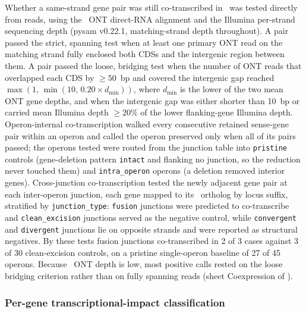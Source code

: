 Whether a same-strand gene pair was still co-transcribed in \syna~was tested directly from reads, using the \syna~ONT direct-RNA alignment and the Illumina per-strand sequencing depth (pysam v0.22.1, matching-strand depth throughout).
A pair passed the strict, spanning test when at least one primary ONT read on the matching strand fully enclosed both CDSs and the intergenic region between them.
A pair passed the loose, bridging test when the number of ONT reads that overlapped each CDS by $\geq 50$~bp and covered the intergenic gap reached $\max(1,\, \min(10,\, 0.20 \times d_{\min}))$, where $d_{\min}$ is the lower of the two mean ONT gene depths, and when the intergenic gap was either shorter than 10~bp or carried mean Illumina depth $\geq 20\%$ of the lower flanking-gene Illumina depth.
Operon-internal co-transcription walked every consecutive retained sense-gene pair within an operon and called the operon preserved only when all of its pairs passed; the operons tested were routed from the junction table into \texttt{pristine} controls (gene-deletion pattern \texttt{intact} and flanking no junction, so the reduction never touched them) and \texttt{intra\_operon} operons (a deletion removed interior genes).
Cross-junction co-transcription tested the newly adjacent gene pair at each inter-operon junction, each gene mapped to its \syna~ortholog by locus suffix, stratified by \texttt{junction\_type}: \texttt{fusion} junctions were predicted to co-transcribe and \texttt{clean\_excision} junctions served as the negative control, while \texttt{convergent} and \texttt{divergent} junctions lie on opposite strands and were reported as structural negatives.
By these tests fusion junctions co-transcribed in 2 of 3 cases against 3 of 30 clean-excision controls, on a pristine single-operon baseline of 27 of 45 operons.
Because \syna~ONT depth is low, most positive calls rested on the loose bridging criterion rather than on fully spanning reads (sheet Coexpression of \sdreduction).

\subsubsection{Per-gene transcriptional-impact classification}

